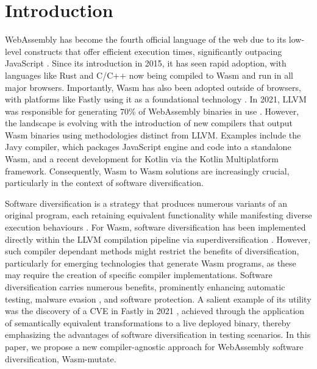 \documentclass[sigplan,screen]{acmart}
\newcommand{\tool}{Wasm-mutate\xspace}
\newcommand{\wasm}{Wasm\xspace}
\newcommand{\Wasm}{WebAssembly\xspace}
\begin{document}

\section{Introduction}


\Wasm has become the fourth official language of the web due to its low-level constructs that offer efficient execution times, significantly outpacing JavaScript \cite{haas2017bringing, WebAssemblyCoreSpecification}. 
Since its introduction in 2015, it has seen rapid adoption, with languages like Rust and C/C++ now being compiled to \wasm and run in all major browsers. 
Importantly, \wasm has also been adopted outside of browsers, with platforms like Fastly using it as a foundational technology \cite{fastly}.
In 2021, LLVM was responsible for generating 70\% of \Wasm binaries in use \cite{hilbig2021empirical}. However, the landscape is evolving with the introduction of new compilers that output \wasm binaries using methodologies distinct from LLVM. 
Examples include the Javy compiler, which packages JavaScript engine and code into a standalone \wasm \cite{javy}, and a recent development for Kotlin via the Kotlin Multiplatform framework\cite{kmm}. 
Consequently, \wasm to \wasm solutions are increasingly crucial, particularly in the context of software diversification.

Software diversification is a strategy that produces numerous variants of an original program, each retaining equivalent functionality while manifesting diverse execution behaviours \cite{cohen1993operating}. 
For \wasm, software diversification has been implemented directly within the LLVM compilation pipeline via superdiversification \cite{arteaga2020crow, MEWE}. 
However, such compiler dependant methods might restrict the benefits of diversification, particularly for emerging technologies that generate \wasm programs, as these may require the creation of specific compiler implementations. 
Software diversification carries numerous benefits, prominently enhancing automatic testing, malware evasion \cite{CABRERAARTEAGA2023103296}, and software protection. 
A salient example of its utility was the discovery of a CVE in Fastly in 2021 \cite{CVE}, achieved through the application of semantically equivalent transformations to a live deployed binary, thereby emphasizing the advantages of software diversification in testing scenarios.
In this paper, we propose a new compiler-agnostic approach for \Wasm software diversification, \tool.
\end{document}
